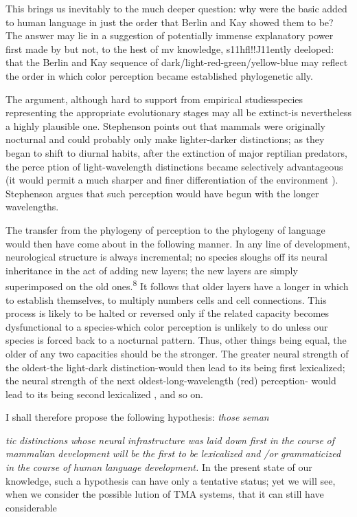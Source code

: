 This brings us inevitably to the much deeper question: why were the basic  added to human language in just the order that Berlin and Kay showed them to be? The answer may lie in a suggestion of potentially immense explanatory power first made by \citet{Stephenson1973} but not, to the hest of mv knowledge, s11hfl!!J11ently deeloped: that the Berlin and Kay sequence of dark/light-red-green/yellow-blue may reflect the order in which color perception became established phylogenetic ally.

The argument, although hard to support from empirical studies\-species representing the appropriate evolutionary stages may all be extinct-is nevertheless a highly plausible one. Stephenson points out that mammals were originally nocturnal and could probably only make
lighter-darker distinctions; as they began to shift to diurnal habits, after the extinction of major reptilian predators, the perce ption of light-wavelength distinctions became selectively advantageous (it 
would permit a much sharper and finer differentiation of the environ\-ment ). Stephenson argues that such perception would have begun with the longer wavelengths.

The transfer from the phylogeny of perception to the phylogeny
of language would then have come about in the following manner. In any line of development, neurological structure is always incremental; no species sloughs off its neural inheritance in the act of adding new layers; the new layers are simply superimposed on the old ones.\textsuperscript{8} It follows that older layers have a longer  in which to establish themselves, to multiply numbers cells and cell connections. This process is likely to be halted or reversed only if the related capacity becomes dysfunctional to a species-which color perception is unlikely to do unless our species is forced back to a nocturnal pattern. Thus, other things being equal, the older of any two capacities should be the stronger. The greater neural strength of the oldest-the light-dark distinction-would then lead to its being first lexicalized; the neural strength of the next oldest-long-wavelength (red) perception- would lead to its being second lexicalized , and so on.

I shall therefore propose the following hypothesis: \textit{those} \textit{seman\-}

\textit{tic} \textit{distinctions} \textit{whose} \textit{neural} \textit{i}\textit{n}\textit{frastructure was} \textit{laid} \textit{down first} \textit{in} \textit{the} \textit{course} \textit{o}\textit{f} \textit{mammalian} \textit{development} \textit{will} \textit{be} \textit{the} \textit{first to} \textit{be} \textit{lexicalized} \textit{and} \textit{/or} \textit{grammaticized in} \textit{the} \textit{course} \textit{o}\textit{f} \textit{human} \textit{language} \textit{development.} In the present state of our knowledge, such a hypothesis can have only a tentative status; yet we will see, when we consider the possible lution of TMA systems, that it can still have considerable

